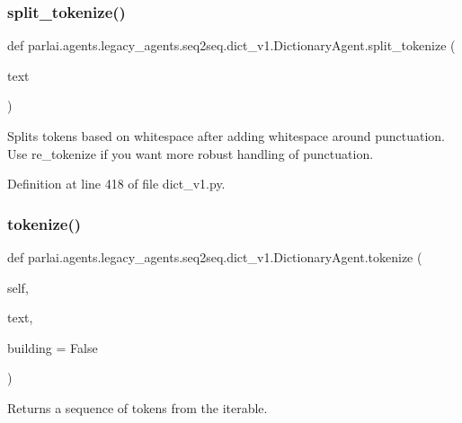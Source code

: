 \subsubsection{\texorpdfstring{split\+\_\+tokenize()}{split\_tokenize()}}
{\footnotesize\ttfamily def parlai.\+agents.\+legacy\+\_\+agents.\+seq2seq.\+dict\+\_\+v1.\+Dictionary\+Agent.\+split\+\_\+tokenize (\begin{DoxyParamCaption}\item[{}]{text }\end{DoxyParamCaption})\hspace{0.3cm}{\ttfamily [static]}}

\begin{DoxyVerb}Splits tokens based on whitespace after adding whitespace around
punctuation.
Use re_tokenize if you want more robust handling of punctuation.
\end{DoxyVerb}
 

Definition at line 418 of file dict\+\_\+v1.\+py.

\mbox{\label{classparlai_1_1agents_1_1legacy__agents_1_1seq2seq_1_1dict__v1_1_1DictionaryAgent_af8cf51195d4443615727cf0bdcdace0f}} 
\subsubsection{\texorpdfstring{tokenize()}{tokenize()}}
{\footnotesize\ttfamily def parlai.\+agents.\+legacy\+\_\+agents.\+seq2seq.\+dict\+\_\+v1.\+Dictionary\+Agent.\+tokenize (\begin{DoxyParamCaption}\item[{}]{self,  }\item[{}]{text,  }\item[{}]{building = {\ttfamily False} }\end{DoxyParamCaption})}

\begin{DoxyVerb}Returns a sequence of tokens from the iterable.\end{DoxyVerb}
 


